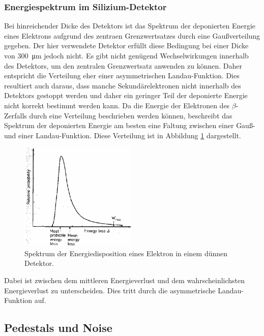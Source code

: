 \subsubsection{Energiespektrum im Silizium-Detektor}
Bei hinreichender Dicke des Detektors ist das Spektrum der deponierten Energie eines
Elektrons aufgrund des zentraen Grenzwertsatzes durch eine Gaußverteilung gegeben.
Der hier verwendete Detektor erfüllt diese Bedingung bei einer Dicke von
\SI{300}{\micro\meter} jedoch nicht. Es gibt nicht genügend Wechselwirkungen
innerhalb des Detektors, um den zentralen Grenzwertsatz anwenden zu können.
Daher entspricht die Verteilung eher einer asymmetrischen Landau-Funktion.
Dies resultiert auch daraus, dass manche
Sekundärelektronen nicht innerhalb des Detektors gestoppt werden und daher
ein geringer Teil der deponierte Energie nicht korrekt bestimmt werden kann.
Da die Energie der Elektronen des $\beta$-Zerfalls durch eine Verteilung beschrieben
werden können, beschreibt das Spektrum der deponierten Energie am besten eine Faltung zwischen
einer Gauß- und einer Landau-Funktion. Diese Verteilung ist in Abbildung \ref{fig:faltung}
dargestellt.
\begin{figure}[htb]
  \centering
  \includegraphics[width=0.5\textwidth]{images/Landau.png}
  \caption{Spektrum der Energiedisposition eines Elektron in einem dünnen Detektor. \cite{anleitung}}
  \label{fig:faltung}
\end{figure}
Dabei ist zwischen dem mittleren Energieverlust und dem wahrscheinlichsten Energieverlust
zu unterscheiden. Dies tritt durch die asymmetrische Landau-Funktion auf.


\FloatBarrier
\subsection{Pedestals und Noise}
\label{sec:Theorie_Noise}

